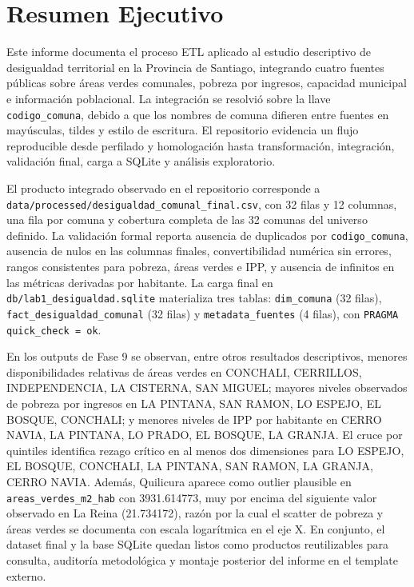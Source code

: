 \chapter*{Resumen Ejecutivo}

Este informe documenta el proceso ETL aplicado al estudio descriptivo de desigualdad territorial en la Provincia de Santiago, integrando cuatro fuentes públicas sobre áreas verdes comunales, pobreza por ingresos, capacidad municipal e información poblacional. La integración se resolvió sobre la llave \texttt{codigo\_comuna}, debido a que los nombres de comuna difieren entre fuentes en mayúsculas, tildes y estilo de escritura. El repositorio evidencia un flujo reproducible desde perfilado y homologación hasta transformación, integración, validación final, carga a SQLite y análisis exploratorio.

El producto integrado observado en el repositorio corresponde a \texttt{data/processed/desigualdad\_comunal\_final.csv}, con 32 filas y 12 columnas, una fila por comuna y cobertura completa de las 32 comunas del universo definido. La validación formal reporta ausencia de duplicados por \texttt{codigo\_comuna}, ausencia de nulos en las columnas finales, convertibilidad numérica sin errores, rangos consistentes para pobreza, áreas verdes e IPP, y ausencia de infinitos en las métricas derivadas por habitante. La carga final en \texttt{db/lab1\_desigualdad.sqlite} materializa tres tablas: \texttt{dim\_comuna} (32 filas), \texttt{fact\_desigualdad\_comunal} (32 filas) y \texttt{metadata\_fuentes} (4 filas), con \texttt{PRAGMA quick\_check = ok}.

En los outputs de Fase 9 se observan, entre otros resultados descriptivos, menores disponibilidades relativas de áreas verdes en CONCHALI, CERRILLOS, INDEPENDENCIA, LA CISTERNA, SAN MIGUEL; mayores niveles observados de pobreza por ingresos en LA PINTANA, SAN RAMON, LO ESPEJO, EL BOSQUE, CONCHALI; y menores niveles de IPP por habitante en CERRO NAVIA, LA PINTANA, LO PRADO, EL BOSQUE, LA GRANJA. El cruce por quintiles identifica rezago crítico en al menos dos dimensiones para LO ESPEJO, EL BOSQUE, CONCHALI, LA PINTANA, SAN RAMON, LA GRANJA, CERRO NAVIA. Además, Quilicura aparece como outlier plausible en \texttt{areas\_verdes\_m2\_hab} con 3931.614773, muy por encima del siguiente valor observado en La Reina (21.734172), razón por la cual el scatter de pobreza y áreas verdes se documenta con escala logarítmica en el eje X. En conjunto, el dataset final y la base SQLite quedan listos como productos reutilizables para consulta, auditoría metodológica y montaje posterior del informe en el template externo.
